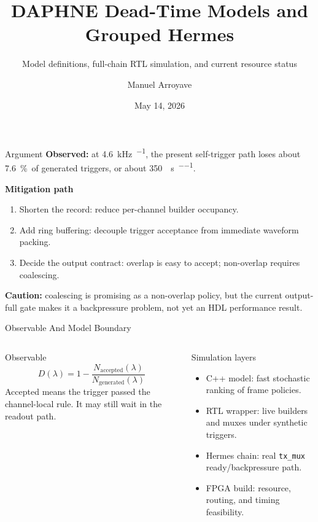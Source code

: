 \documentclass[aspectratio=169]{beamer}
\title[DAPHNE Dead-Time Models and Grouped Hermes]{DAPHNE Dead-Time Models and Grouped Hermes}
\subtitle{Model definitions, full-chain RTL simulation, and current resource status}
\author{Manuel Arroyave}
\date{May 14, 2026}
\newcommand{\fdhdrate}{\SI{4.6}{\kilo\hertz\per\channel}}
\newcommand{\fdhddead}{\SI{7.6}{\percent}}
\begin{document}
\begin{frame}
  \titlepage
\end{frame}

\begin{frame}{Argument}
\footnotesize
\textbf{Observed:} at \fdhdrate, the present self-trigger path loses about \fdhddead\ of generated triggers, or about \SI{350}{\trigger\per\second\per\channel}.

\vspace{0.8em}
\textbf{Mitigation path}
\begin{enumerate}
  \item Shorten the record: reduce per-channel builder occupancy.
  \item Add ring buffering: decouple trigger acceptance from immediate waveform packing.
  \item Decide the output contract: overlap is easy to accept; non-overlap requires coalescing.
\end{enumerate}

\vspace{0.8em}
\textbf{Caution:} coalescing is promising as a non-overlap policy, but the current output-full gate makes it a backpressure problem, not yet an HDL performance result.
\end{frame}

\begin{frame}{Observable And Model Boundary}
\footnotesize
\begin{columns}[T,onlytextwidth]
\begin{block}{Observable}
\[
D(\lambda)=1-
\frac{N_{\mathrm{accepted}}(\lambda)}
     {N_{\mathrm{generated}}(\lambda)}
\]
Accepted means the trigger passed the channel-local rule. It may still wait in the readout path.
\end{block}

\begin{block}{Simulation layers}
\begin{itemize}
  \item C++ model: fast stochastic ranking of frame policies.
  \item RTL wrapper: live builders and muxes under synthetic triggers.
  \item Hermes chain: real \texttt{tx\_mux} ready/backpressure path.
  \item FPGA build: resource, routing, and timing feasibility.
\end{itemize}
\end{block}
\end{columns}

\end{frame}
\end{document}
